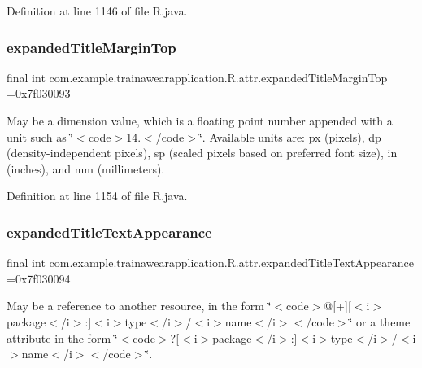 Definition at line 1146 of file R.\+java.

\mbox{\label{classcom_1_1example_1_1trainawearapplication_1_1_r_1_1attr_a9a2aaef8eff80b68623b01e483006acd}} 
\subsubsection{\texorpdfstring{expandedTitleMarginTop}{expandedTitleMarginTop}}
{\footnotesize\ttfamily final int com.\+example.\+trainawearapplication.\+R.\+attr.\+expanded\+Title\+Margin\+Top =0x7f030093\hspace{0.3cm}{\ttfamily [static]}}

May be a dimension value, which is a floating point number appended with a unit such as \char`\"{}$<$code$>$14.\+5sp$<$/code$>$\char`\"{}. Available units are\+: px (pixels), dp (density-\/independent pixels), sp (scaled pixels based on preferred font size), in (inches), and mm (millimeters). 

Definition at line 1154 of file R.\+java.

\mbox{\label{classcom_1_1example_1_1trainawearapplication_1_1_r_1_1attr_a764fad017c8024de08383ee6a59abf70}} 
\subsubsection{\texorpdfstring{expandedTitleTextAppearance}{expandedTitleTextAppearance}}
{\footnotesize\ttfamily final int com.\+example.\+trainawearapplication.\+R.\+attr.\+expanded\+Title\+Text\+Appearance =0x7f030094\hspace{0.3cm}{\ttfamily [static]}}

May be a reference to another resource, in the form \char`\"{}$<$code$>$@\mbox{[}+\mbox{]}\mbox{[}$<$i$>$package$<$/i$>$\+:\mbox{]}$<$i$>$type$<$/i$>$/$<$i$>$name$<$/i$>$$<$/code$>$\char`\"{} or a theme attribute in the form \char`\"{}$<$code$>$?\mbox{[}$<$i$>$package$<$/i$>$\+:\mbox{]}$<$i$>$type$<$/i$>$/$<$i$>$name$<$/i$>$$<$/code$>$\char`\"{}. 

